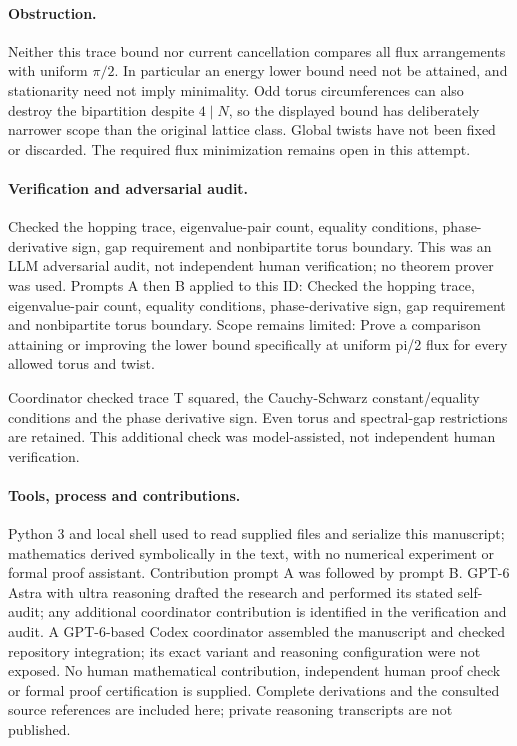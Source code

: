 \documentclass[11pt]{article}
\begin{document}
\paragraph{Obstruction.}Neither this trace bound nor current cancellation compares all flux arrangements with uniform \(\pi/2\). In particular an energy lower bound need not be attained, and stationarity need not imply minimality. Odd torus circumferences can also destroy the bipartition despite \(4\mid N\), so the displayed bound has deliberately narrower scope than the original lattice class. Global twists have not been fixed or discarded. The required flux minimization remains open in this attempt.

\paragraph{Verification and adversarial audit.}
Checked the hopping trace, eigenvalue-pair count, equality conditions, phase-derivative sign, gap requirement and nonbipartite torus boundary. This was an LLM adversarial audit, not independent human verification; no theorem prover was used. Prompts A then B applied to this ID: Checked the hopping trace, eigenvalue-pair count, equality conditions, phase-derivative sign, gap requirement and nonbipartite torus boundary. Scope remains limited: Prove a comparison attaining or improving the lower bound specifically at uniform pi/2 flux for every allowed torus and twist.

Coordinator checked trace T squared, the Cauchy-Schwarz constant/equality conditions and the phase derivative sign. Even torus and spectral-gap restrictions are retained. This additional check was model-assisted, not independent human verification.

\paragraph{Tools, process and contributions.}
Python 3 and local shell used to read supplied files and serialize this manuscript; mathematics derived symbolically in the text, with no numerical experiment or formal proof assistant. Contribution prompt A was followed by prompt B. GPT-6 Astra with ultra reasoning drafted the research and performed its stated self-audit; any additional coordinator contribution is identified in the verification and audit. A GPT-6-based Codex coordinator assembled the manuscript and checked repository integration; its exact variant and reasoning configuration were not exposed. No human mathematical contribution, independent human proof check or formal proof certification is supplied. Complete derivations and the consulted source references are included here; private reasoning transcripts are not published.
\end{document}
